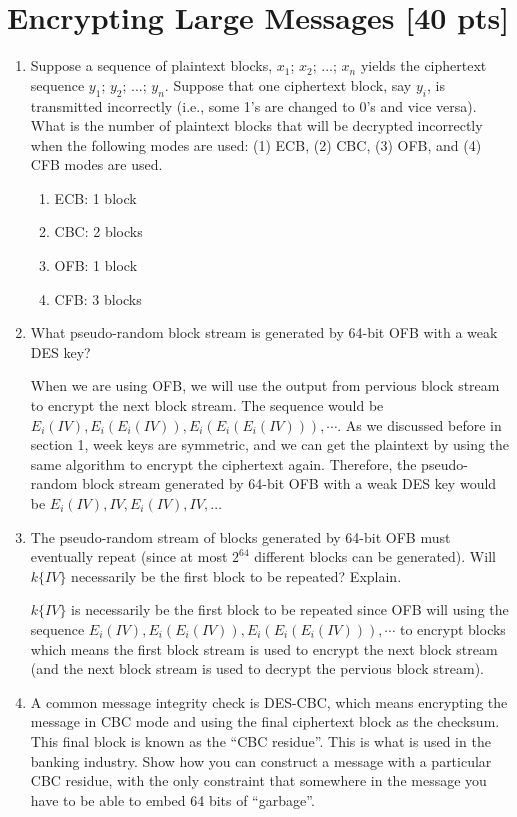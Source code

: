 \documentclass[11pt]{article}
\begin{document}
\section{Encrypting Large Messages [40 pts]}
\begin{enumerate}
\item Suppose a sequence of plaintext blocks, $x_1$; $x_2$; ...; $x_n$ yields the ciphertext sequence $y_1$; $y_2$; ...; $y_n$. Suppose that one ciphertext block, say $y_i$, is transmitted incorrectly (i.e., some 1's are changed to 0's and vice versa). What is the number of plaintext blocks that will be decrypted incorrectly when the following modes are used: (1) ECB, (2) CBC, (3) OFB, and (4) CFB modes are used.

  \begin{enumerate}
    \item ECB: 1 block
    \item CBC: 2 blocks
    \item OFB: 1 block
    \item CFB: 3 blocks
  \end{enumerate}

\clearpage

\item What pseudo-random block stream is generated by 64-bit OFB with a weak DES key?

When we are using OFB, we will use the output from pervious block stream to encrypt the next block stream. The sequence would be $E_{i}(IV), E_{i}(E_{i}(IV)), E_{i}(E_{i}(E_{i}(IV))), \cdots$. As we discussed before in section 1, week keys are symmetric, and we can get the plaintext by using the same algorithm to encrypt the ciphertext again. Therefore, the pseudo-random block stream generated by 64-bit OFB with a weak DES key would be $E_{i}(IV), IV, E_{i}(IV), IV, \ldots$

\item The pseudo-random stream of blocks generated by 64-bit OFB must eventually repeat (since at most $2^{64}$ different blocks can be generated). Will $k\{IV\}$ necessarily be the first block to be repeated? Explain.

$k\{IV\}$ is necessarily be the first block to be repeated since OFB will using the sequence $E_{i}(IV), E_{i}(E_{i}(IV)), E_{i}(E_{i}(E_{i}(IV))), \cdots$ to encrypt blocks which means the first block stream is used to encrypt the next block stream (and the next block stream is used to decrypt the pervious block stream).

\item A common message integrity check is DES-CBC, which means encrypting the message in CBC mode and using the final ciphertext block as the checksum. This final block is known as the ``CBC residue''. This is what is used in the banking industry. Show how you can construct a message with a particular CBC residue, with the only constraint that somewhere in the message you have to be able to embed 64 bits of ``garbage''.


\end{enumerate}
\end{document}
